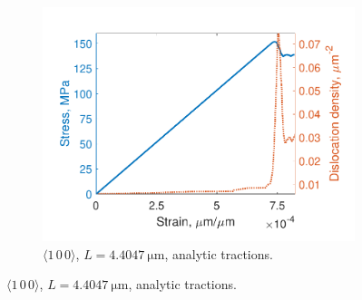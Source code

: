 \begin{figure}
    \begin{subfigure}[t]{0.45\linewidth}
        \centering
        \includegraphics[width=\linewidth]{../data/density_16-Mar-2021_8_tensile_ni_100.pdf}
        \caption{$\langle 1\, 0\, 0 \rangle$, $L = \SI{4.4047}{\micro\metre}$, analytic tractions.}
        \label{sf:stressDens3}
    \end{subfigure}


\end{figure}

